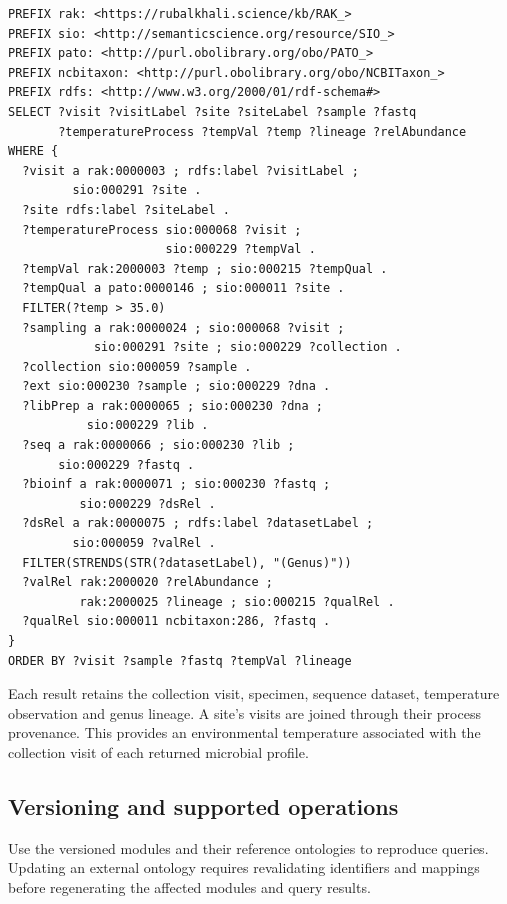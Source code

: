 \begin{revision}
\begin{lstlisting}[caption={SPARQL query to retrieve Pseudomonas relative abundance at sites with high temperature.}, label={lst:sparql_env_tax}, basicstyle=\ttfamily\scriptsize, frame=single]
PREFIX rak: <https://rubalkhali.science/kb/RAK_>
PREFIX sio: <http://semanticscience.org/resource/SIO_>
PREFIX pato: <http://purl.obolibrary.org/obo/PATO_>
PREFIX ncbitaxon: <http://purl.obolibrary.org/obo/NCBITaxon_>
PREFIX rdfs: <http://www.w3.org/2000/01/rdf-schema#>
SELECT ?visit ?visitLabel ?site ?siteLabel ?sample ?fastq
       ?temperatureProcess ?tempVal ?temp ?lineage ?relAbundance
WHERE {
  ?visit a rak:0000003 ; rdfs:label ?visitLabel ;
         sio:000291 ?site .
  ?site rdfs:label ?siteLabel .
  ?temperatureProcess sio:000068 ?visit ;
                      sio:000229 ?tempVal .
  ?tempVal rak:2000003 ?temp ; sio:000215 ?tempQual .
  ?tempQual a pato:0000146 ; sio:000011 ?site .
  FILTER(?temp > 35.0)
  ?sampling a rak:0000024 ; sio:000068 ?visit ;
            sio:000291 ?site ; sio:000229 ?collection .
  ?collection sio:000059 ?sample .
  ?ext sio:000230 ?sample ; sio:000229 ?dna .
  ?libPrep a rak:0000065 ; sio:000230 ?dna ;
           sio:000229 ?lib .
  ?seq a rak:0000066 ; sio:000230 ?lib ;
       sio:000229 ?fastq .
  ?bioinf a rak:0000071 ; sio:000230 ?fastq ;
          sio:000229 ?dsRel .
  ?dsRel a rak:0000075 ; rdfs:label ?datasetLabel ;
         sio:000059 ?valRel .
  FILTER(STRENDS(STR(?datasetLabel), "(Genus)"))
  ?valRel rak:2000020 ?relAbundance ;
          rak:2000025 ?lineage ; sio:000215 ?qualRel .
  ?qualRel sio:000011 ncbitaxon:286, ?fastq .
}
ORDER BY ?visit ?sample ?fastq ?tempVal ?lineage
\end{lstlisting}

Each result retains the collection visit, specimen, sequence dataset,
temperature observation and genus lineage. A site's visits are joined
through their process provenance. This provides an environmental
temperature associated with the collection visit of each returned
microbial profile.


\subsection{Versioning and supported operations}

Use the versioned modules and their reference ontologies to reproduce
queries. Updating an external ontology requires revalidating identifiers
and mappings before regenerating the affected modules and query results.


\end{revision}
